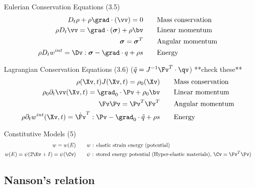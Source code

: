 \documentclass[11pt]{article}
\newcommand{\sigmav}{\boldsymbol{\sigma}}
\begin{document}
Eulerian Conservation Equations (3.5)
 \begin{align}
  D_t \rho + \rho\grad\cdot(\vv)=0 & \qquad \mbox{Mass conservation} \\
  \rho D_t \vv = \grad\cdot( \sigmav) + \rho \bv  & \qquad \mbox{Linear momentum} \\
  \sigmav = \sigmav^T  & \qquad \mbox{Angular momentum} \\
  \rho D_t w^{int} = \Dv:\sigmav -\grad\cdot q + \rho s  & \qquad \mbox{Energy} 
\end{align}

Lagrangian Conservation Equations (3.6) ($\tilde{q}=J^{-1}\Fv^T\cdot\qv$) **check these**
 \begin{align}
  \rho(\Xv,t) J(\Xv,t) = \rho_0(\Xv) & \qquad \mbox{Mass conservation} \\
  \rho_0 \partial_t \vv(\Xv,t) = \grad_0\cdot \Pv + \rho_0 \bv  & \qquad \mbox{Linear momentum} \\
  \Fv\Pv = \Pv^T\Fv^T & \qquad \mbox{Angular momentum} \\
  \rho \partial_t w^{int}(\Xv,t) = \dot{\Fv}^T:\Pv -\grad_0\cdot\tilde{q} + \rho s  & \qquad \mbox{Energy} 
\end{align}


Constitutive Models (5)
 \begin{align}
    w=w(E)  & \qquad \mbox{$w$ : elastic strain energy (potential)} \\
    w(E) = \psi(2\Ev+I) = \psi(\Cv)  & \qquad \mbox{$\psi$ : stored energy potential (Hyper-elastic materials), $\Cv=\Fv^T\Fv$)} \\
\end{align}

\subsection{Nanson's relation}
\end{document}

